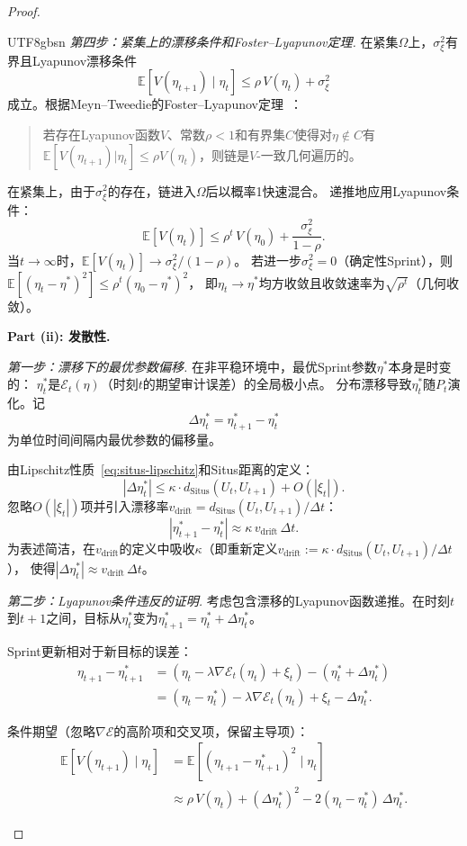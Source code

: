 \documentclass[12pt,a4paper]{article}
\newcommand{\E}{\mathbb{E}}
\newcommand{\Situs}{\mathrm{Situs}}
\begin{document}
\begin{proof}
\begin{CJK}{UTF8}{gbsn}
\emph{第四步：紧集上的漂移条件和Foster--Lyapunov定理.}
在紧集$\Omega$上，$\sigma_\xi^2$有界且Lyapunov漂移条件
\[
\E[V(\eta_{t+1}) \mid \eta_t] \le \rho\,V(\eta_t) + \sigma_\xi^2
\]
成立。根据Meyn--Tweedie的Foster--Lyapunov定理~\citep{meyn2012markov}：
\begin{quote}
若存在Lyapunov函数$V$、常数$\rho < 1$和有界集$C$使得对$\eta \notin C$有
$\E[V(\eta_{t+1})|\eta_t] \le \rho V(\eta_t)$，则链是$V$-一致几何遍历的。
\end{quote}
在紧集上，由于$\sigma_\xi^2$的存在，链进入$\Omega$后以概率1快速混合。
递推地应用Lyapunov条件：
\[
\E[V(\eta_t)] \le \rho^t\,V(\eta_0) + \frac{\sigma_\xi^2}{1-\rho}.
\]
当$t \to \infty$时，$\E[V(\eta_t)] \to \sigma_\xi^2/(1-\rho)$。
若进一步$\sigma_\xi^2 = 0$（确定性Sprint），则$\E[(\eta_t - \eta^*)^2] \le \rho^t (\eta_0 - \eta^*)^2$，
即$\eta_t \to \eta^*$均方收敛且收敛速率为$\sqrt{\rho^t}$（几何收敛）。

\medskip\noindent
\textbf{Part (ii): 发散性.}

\emph{第一步：漂移下的最优参数偏移.}
在非平稳环境中，最优Sprint参数$\eta^*$本身是时变的：
$\eta^*_t$是$\mathcal{E}_t(\eta)$（时刻$t$的期望审计误差）的全局极小点。
分布漂移导致$\eta^*_t$随$P_t$演化。记
\[
\Delta\eta^*_t = \eta^*_{t+1} - \eta^*_t
\]
为单位时间间隔内最优参数的偏移量。

由Lipschitz性质~\eqref{eq:situs-lipschitz}和Situs距离的定义：
\[
|\Delta\eta^*_t| \le \kappa \cdot d_{\Situs}(U_t, U_{t+1}) + O(|\xi_t|).
\]
忽略$O(|\xi_t|)$项并引入漂移率$v_{\text{drift}} = d_{\Situs}(U_t, U_{t+1})/\Delta t$：
\[
|\eta^*_{t+1} - \eta^*_t| \approx \kappa\,v_{\text{drift}}\,\Delta t.
\]
为表述简洁，在$v_{\text{drift}}$的定义中吸收$\kappa$（即重新定义$v_{\text{drift}} := \kappa\cdot d_{\Situs}(U_t,U_{t+1})/\Delta t$），
使得$|\Delta\eta^*_t| \approx v_{\text{drift}}\,\Delta t$。

\emph{第二步：Lyapunov条件违反的证明.}
考虑包含漂移的Lyapunov函数递推。在时刻$t$到$t+1$之间，目标从$\eta^*_t$变为$\eta^*_{t+1} = \eta^*_t + \Delta\eta^*_t$。

Sprint更新相对于新目标的误差：
\[
\begin{aligned}
\eta_{t+1} - \eta^*_{t+1}
&= (\eta_t - \lambda\nabla\mathcal{E}_t(\eta_t) + \xi_t) - (\eta^*_t + \Delta\eta^*_t) \\
&= (\eta_t - \eta^*_t) - \lambda\nabla\mathcal{E}_t(\eta_t) + \xi_t - \Delta\eta^*_t.
\end{aligned}
\]

条件期望（忽略$\nabla\mathcal{E}$的高阶项和交叉项，保留主导项）：
\[
\begin{aligned}
\E[V(\eta_{t+1}) \mid \eta_t]
&= \E[(\eta_{t+1} - \eta^*_{t+1})^2 \mid \eta_t] \\
&\approx \rho\,V(\eta_t) + (\Delta\eta^*_t)^2
   - 2(\eta_t - \eta^*_t)\,\Delta\eta^*_t.
\end{aligned}
\]


\end{CJK}
\end{proof}
\end{document}
